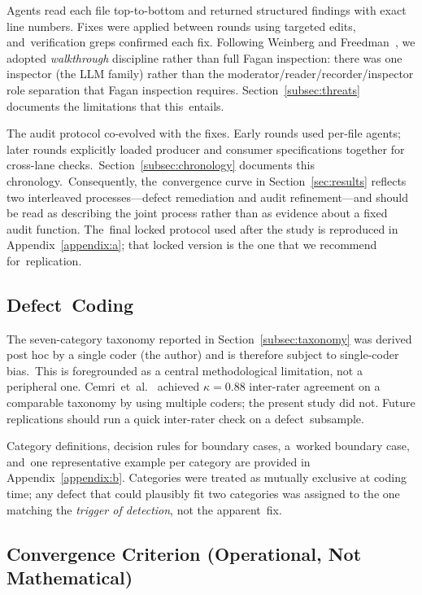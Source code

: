 \documentclass[software,article,accept,pdftex,oneauthor]{Definitions/mdpi}
\def\hl#1{#1}
\begin{document}
Agents read each file top-to-bottom and returned structured findings with exact line numbers. Fixes were applied between rounds using targeted edits, and~verification greps confirmed each fix. Following Weinberg and Freedman~\cite{weinberg1984reviews}, we adopted \emph{\hl{walkthrough}} discipline rather than full Fagan inspection: there was one inspector (the LLM family) rather than the moderator/reader/recorder/inspector role separation that Fagan inspection requires. Section~\ref{subsec:threats} documents the limitations that this~entails.

The audit protocol co-evolved with the fixes. Early rounds used per-file agents; later rounds explicitly loaded producer and consumer specifications together for cross-lane checks.~Section~\ref{subsec:chronology} documents this chronology.~Consequently, the~convergence curve \linebreak  in Section~\ref{sec:results} reflects two interleaved processes---defect remediation and audit refinement---and should be read as describing the joint process rather than as evidence about a fixed audit function. The~final locked protocol used after the study is reproduced in Appendix~\ref{appendix:a}; that locked version is the one that we recommend for~replication.

\subsection{Defect~Coding}

The seven-category taxonomy reported in Section~\ref{subsec:taxonomy} was derived post hoc by a single coder (the author) and is therefore subject to single-coder bias.~This is foregrounded as a central methodological limitation, not a peripheral one. Cemri~et~al.~\cite{cemri2025multiagent_fail} achieved \(\kappa = 0.88\) inter-rater agreement on a comparable taxonomy by using multiple coders; the present study did not. Future replications should run a quick inter-rater check on a defect~subsample.

Category definitions, decision rules for boundary cases, a~worked boundary case, and~one representative example per category are provided in Appendix~\ref{appendix:b}. Categories were treated as mutually exclusive at coding time; any defect that could plausibly fit two categories was assigned to the one matching the \emph{\hl{trigger of detection}}, not the apparent~fix.

\subsection{Convergence Criterion (Operational, Not Mathematical)}
\end{document}
